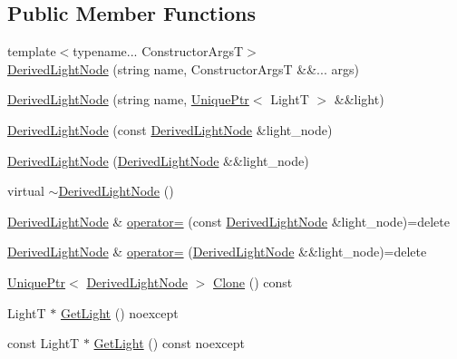 \subsection*{Public Member Functions}
\begin{DoxyCompactItemize}
\item 
{\footnotesize template$<$typename... Constructor\+ArgsT$>$ }\\\hyperlink{classmage_1_1_derived_light_node_a6de065efac41dc01253a5ccb78accefd}{Derived\+Light\+Node} (string name, Constructor\+ArgsT \&\&... args)
\item 
\hyperlink{classmage_1_1_derived_light_node_a6ba9c259d7e1c1c4cba0faa55ea4daa9}{Derived\+Light\+Node} (string name, \hyperlink{namespacemage_a3316d7143a973e37adf1110f2e80ca31}{Unique\+Ptr}$<$ LightT $>$ \&\&light)
\item 
\hyperlink{classmage_1_1_derived_light_node_a719b8fe088b93a7ecfb6d21b99cc170b}{Derived\+Light\+Node} (const \hyperlink{classmage_1_1_derived_light_node}{Derived\+Light\+Node} \&light\+\_\+node)
\item 
\hyperlink{classmage_1_1_derived_light_node_af99017273f3f8bedcbd3842c31e4ecc4}{Derived\+Light\+Node} (\hyperlink{classmage_1_1_derived_light_node}{Derived\+Light\+Node} \&\&light\+\_\+node)
\item 
virtual \hyperlink{classmage_1_1_derived_light_node_ad4b2371e323d30eda05744237d4dc4eb}{$\sim$\+Derived\+Light\+Node} ()
\item 
\hyperlink{classmage_1_1_derived_light_node}{Derived\+Light\+Node} \& \hyperlink{classmage_1_1_derived_light_node_ad4a81ae2a671d6c278c74dead4660949}{operator=} (const \hyperlink{classmage_1_1_derived_light_node}{Derived\+Light\+Node} \&light\+\_\+node)=delete
\item 
\hyperlink{classmage_1_1_derived_light_node}{Derived\+Light\+Node} \& \hyperlink{classmage_1_1_derived_light_node_a7eabbc97578958f97a7ec11728364eec}{operator=} (\hyperlink{classmage_1_1_derived_light_node}{Derived\+Light\+Node} \&\&light\+\_\+node)=delete
\item 
\hyperlink{namespacemage_a3316d7143a973e37adf1110f2e80ca31}{Unique\+Ptr}$<$ \hyperlink{classmage_1_1_derived_light_node}{Derived\+Light\+Node} $>$ \hyperlink{classmage_1_1_derived_light_node_a38fcbc8d5204f92d0dfd87c1c6d10281}{Clone} () const
\item 
LightT $\ast$ \hyperlink{classmage_1_1_derived_light_node_a1f45fa421b75d663a360bfdd518a1a1d}{Get\+Light} () noexcept
\item 
const LightT $\ast$ \hyperlink{classmage_1_1_derived_light_node_a61ace20169a3924d42abc163ebddc19b}{Get\+Light} () const noexcept
\end{DoxyCompactItemize}
